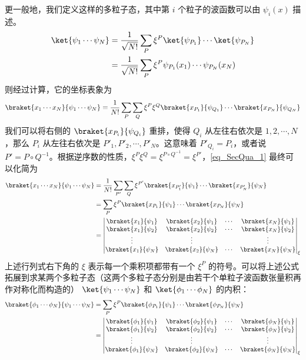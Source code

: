更一般地，我们定义这样的多粒子态，其中第 $i$ 个粒子的波函数可以由 $\psi_i(x)$ 描述。
\begin{equation}
\begin{aligned}
\ket{\psi_1\cdots\psi_N}&=\frac{1}{\sqrt{N!}}\sum_P \xi^P\ket{\psi_{P_1}}\cdots \ket{\psi_{P_N}}\\
&=\frac{1}{\sqrt{N!}}\sum_P \xi^P\psi_{P_1}(x_1)\cdots \psi_{P_N}(x_N)
\end{aligned}
\end{equation}
则经过计算，它的坐标表象为
\begin{equation}\label{eq_SecQua_1}
\braket{x_1\cdots x_N}{\psi_1\cdots\psi_N}=\frac{1}{N!}\sum_P\sum_Q \xi^P \xi^Q \braket{x_{P_1}}{\psi_{Q_1}}\cdots\braket{x_{P_N}}{\psi_{Q_N}}
\end{equation}
我们可以将右侧的 $\braket{x_{P_i}}{\psi_{Q_i}}$ 重排，使得 $Q_i$ 从左往右依次是 $1,2,\cdots,N$，那么 $P_i$ 从左往右依次是 $P'_1,P'_2,\cdots,P'_N$。这意味着 $P'_{Q_i}=P_i$，或者说 $P'=P\circ Q^{-1}$。根据逆序数的性质，$\xi^P\xi^Q=\xi^{P\circ Q^{-1}}=\xi^{P'}$，\autoref{eq_SecQua_1}  最终可以化简为
\begin{equation}
\begin{aligned}
\braket{x_1\cdots x_N}{\psi_1\cdots\psi_N}&=\frac{1}{N!}\sum_{P'}\sum_Q \xi^{P'} \braket{x_{P'_1}}{\psi_{1}}\cdots\braket{x_{P'_N}}{\psi_{N}}\\
&=\sum_{P}\xi^P\braket{x_{P_1}}{\psi_{1}}\cdots\braket{x_{P_N}}{\psi_{N}}\\
&=\left|\begin{matrix}
\braket{x_1}{\psi_1} &\braket{x_2}{\psi_1} &\cdots &\braket{x_N}{\psi_1}\\
\braket{x_1}{\psi_2} &\braket{x_2}{\psi_2} &\cdots & \braket{x_N}{\psi_2}\\
\vdots & \vdots & & \vdots \\
\braket{x_1}{\psi_N} &\braket{x_2}{\psi_N} &\cdots & \braket{x_N}{\psi_N}
\end{matrix}\right|_\xi
\end{aligned}
\end{equation}
上述行列式右下角的 $\xi$ 表示每一个乘积项都带有一个 $\xi^P$ 的符号。可以将上述公式拓展到求某两个多粒子态（这两个多粒子态分别是由若干个单粒子波函数张量积再作对称化而构造的） $\ket{\psi_1\cdots\psi_N}$ 和 $\ket{\phi_1\cdots\phi_N}$ 的内积：
\begin{equation}\label{eq_SecQua_2}
\begin{aligned}
\braket{\phi_1\cdots \phi_N}{\psi_1\cdots\psi_N}
&=\sum_{P}\xi^P\braket{\phi_{P_1}}{\psi_{1}}\cdots\braket{\phi_{P_N}}{\psi_{N}}\\
&=\left|\begin{matrix}
\braket{\phi_1}{\psi_1} &\braket{\phi_2}{\psi_1} &\cdots &\braket{\phi_N}{\psi_1}\\
\braket{\phi_1}{\psi_2} &\braket{\phi_2}{\psi_2} &\cdots & \braket{\phi_N}{\psi_2}\\
\vdots & \vdots & & \vdots \\
\braket{\phi_1}{\psi_N} &\braket{\phi_2}{\psi_N} &\cdots & \braket{\phi_N}{\psi_N}
\end{matrix}\right|_\xi
\end{aligned}
\end{equation}
